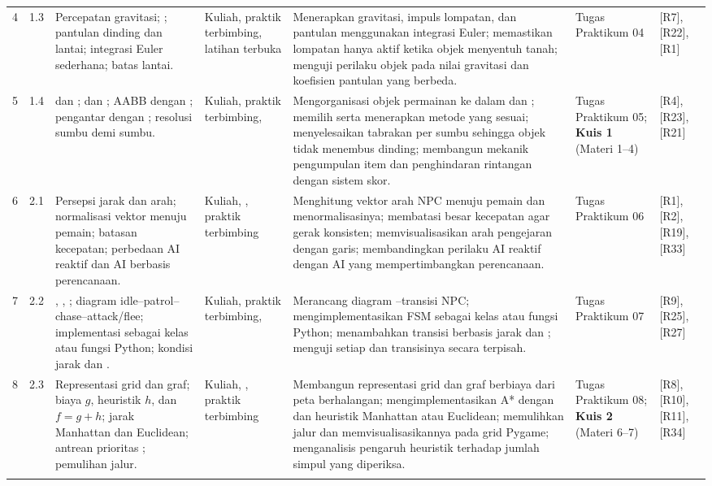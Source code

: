 \begin{landscape}
{\begin{longtable}{@{}L{1.0cm} L{2.0cm} L{4.2cm} L{3.0cm} L{7.8cm} L{3.4cm} L{2.0cm}@{}}
4 & 1.3 &
Percepatan gravitasi; ; pantulan dinding dan lantai; integrasi Euler sederhana; batas lantai. &
Kuliah, praktik terbimbing, latihan terbuka &
Menerapkan gravitasi, impuls lompatan, dan pantulan menggunakan integrasi Euler; memastikan lompatan hanya aktif ketika objek menyentuh tanah; menguji perilaku objek pada nilai gravitasi dan koefisien pantulan yang berbeda. &
Tugas Praktikum 04 & [R7], [R22], [R1] \\
\addlinespace

5 & 1.4 &
 dan ;  dan ; AABB dengan ; pengantar  dengan ; resolusi  sumbu demi sumbu. &
Kuliah, praktik terbimbing,  &
Mengorganisasi objek permainan ke dalam  dan ; memilih serta menerapkan metode  yang sesuai; menyelesaikan tabrakan per sumbu sehingga objek tidak menembus dinding; membangun mekanik pengumpulan item dan penghindaran rintangan dengan sistem skor. &
Tugas Praktikum 05; \textbf{Kuis 1} (Materi 1--4) & [R4], [R23], [R21] \\
\addlinespace

6 & 2.1 &
Persepsi jarak dan arah; normalisasi vektor menuju pemain; batasan kecepatan; perbedaan AI reaktif dan AI berbasis perencanaan. &
Kuliah, , praktik terbimbing &
Menghitung vektor arah NPC menuju pemain dan menormalisasinya; membatasi besar kecepatan agar gerak konsisten; memvisualisasikan arah pengejaran dengan garis; membandingkan perilaku AI reaktif dengan AI yang mempertimbangkan perencanaan. &
Tugas Praktikum 06 & [R1], [R2], [R19], [R33] \\
\addlinespace

7 & 2.2 &
, , ; diagram idle--patrol--chase--attack/flee; implementasi sebagai kelas atau fungsi Python; kondisi jarak dan . &
Kuliah, praktik terbimbing,  &
Merancang diagram --transisi NPC; mengimplementasikan FSM sebagai kelas atau fungsi Python; menambahkan transisi berbasis jarak dan ; menguji setiap  dan transisinya secara terpisah. &
Tugas Praktikum 07 & [R9], [R25], [R27] \\
\addlinespace

8 & 2.3 &
Representasi grid dan graf; biaya $g$, heuristik $h$, dan $f = g + h$; jarak Manhattan dan Euclidean; antrean prioritas ; pemulihan jalur. &
Kuliah, , praktik terbimbing &
Membangun representasi grid dan graf berbiaya dari peta berhalangan; mengimplementasikan A* dengan  dan heuristik Manhattan atau Euclidean; memulihkan jalur dan memvisualisasikannya pada grid Pygame; menganalisis pengaruh heuristik terhadap jumlah simpul yang diperiksa. &
Tugas Praktikum 08; \textbf{Kuis 2} (Materi 6--7) & [R8], [R10], [R11], [R34] \\
\addlinespace


\end{longtable}}
\end{landscape}
